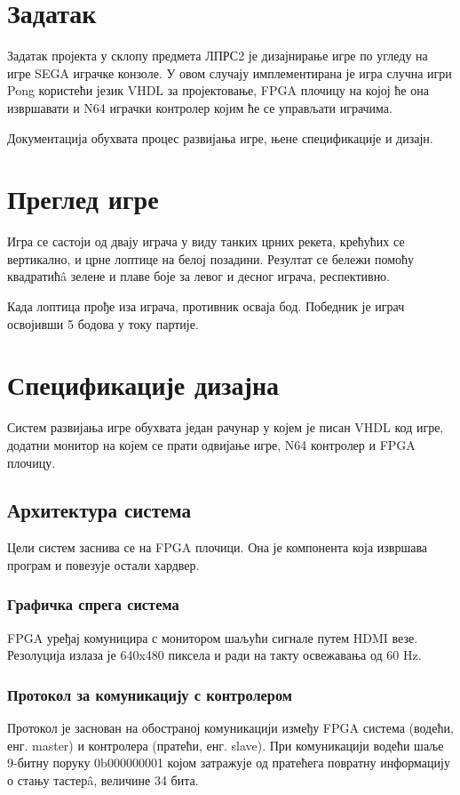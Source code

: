 \documentclass{article}
\begin{document}
\section{Задатак}
Задатак пројекта у склопу предмета ЛПРС2 је дизајнирање игре по угледу на игре SEGA играчке конзоле. У овом случају имплементирана је игра случна игри Pong користећи језик VHDL за пројектовање, FPGA плочицу на којој ће она извршавати и N64 играчки контролер којим ће се управљати играчима.\par

Документација обухвата процес развијања игре, њене спецификације и дизајн.

\section{Преглед игре}
Игра се састоји од двају играча у виду танких црних рекета, крећућих се вертикално, и црне лоптице на белој позадини. Резултат се бележи помоћу квадратићâ зелене и плаве боје за левог и десног играча, респективно.\par
Када лоптица прође иза играча, противник осваја бод. Победник је играч освојивши 5 бодова у току партије.
 

\section{Спецификације дизајна}
Систем развијања игре обухвата један рачунар у којем је писан VHDL код игре, додатни монитор на којем се прати одвијање игре, N64 контролер и FPGA плочицу.
\subsection{Архитектура система}
Цели систем заснива се на FPGA плочици. Она је компонента која извршава програм и повезује остали хардвер.

\subsubsection{Графичка спрега система}
FPGA уређај комуницира с монитором шаљући сигнале путем HDMI везе. Резолуција излаза је 640x480 пиксела и ради на такту освежавања од 60 Hz.

\subsubsection{Протокол за комуникацију с контролером}
Протокол је заснован на обостраној комуникацији између FPGA система (водећи, енг. master) и контролера (пратећи, енг. slave). При комуникацији водећи шаље 9-битну поруку 0b000000001 којом затражује од пратећега повратну информацију о стању тастерâ, величине 34 бита.
\end{document}
